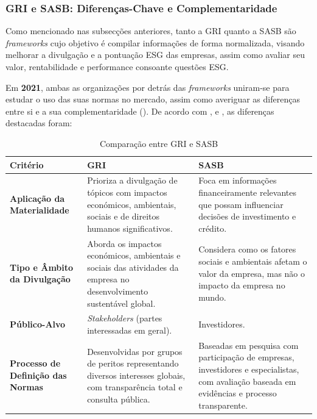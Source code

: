 \subsubsection{GRI e SASB: Diferenças-Chave e Complementaridade}
\label{subsubsec: GRI_E_SASB}

Como mencionado nas subsecções anteriores, tanto a \gls{GRI} quanto a \gls{SASB} são \textit{frameworks} cujo objetivo é compilar informações de forma normalizada, visando melhorar a divulgação e a pontuação ESG das empresas, assim como avaliar seu valor, rentabilidade e performance consoante questões ESG.

Em \textbf{2021}, ambas as organizações por detrás das \textit{frameworks} uniram-se para estudar o uso das suas normas no mercado, assim como averiguar as diferenças entre si e a sua complementaridade (\cite{GRISASB2021}). De acordo com \cite{GRISASB2021}, \cite{Pizzi2023} e \cite{Antolin-Lopez2023}, as diferenças destacadas foram:

\begin{table}
    \centering
    \begin{tabular}{|p{3cm}|p{5cm}|p{5cm}|}
        \hline
        \textbf{Critério} & \textbf{GRI} & \textbf{SASB} \\
        \hline
        \textbf{Aplicação da Materialidade} & Prioriza a divulgação de tópicos com impactos económicos, ambientais, sociais e de direitos humanos significativos. & Foca em informações financeiramente relevantes que possam influenciar decisões de investimento e crédito. \\
        \hline
        \textbf{Tipo e Âmbito da Divulgação} & Aborda os impactos económicos, ambientais e sociais das atividades da empresa no desenvolvimento sustentável global. & Considera como os fatores sociais e ambientais afetam o valor da empresa, mas não o impacto da empresa no mundo. \\
        \hline
        \textbf{Público-Alvo} & \textit{Stakeholders} (partes interessadas em geral). & Investidores. \\
        \hline
        \textbf{Processo de Definição das Normas} & Desenvolvidas por grupos de peritos representando diversos interesses globais, com transparência total e consulta pública. & Baseadas em pesquisa com participação de empresas, investidores e especialistas, com avaliação baseada em evidências e processo transparente. \\
        \hline
    \end{tabular}
    \caption{Comparação entre GRI e SASB}
    \label{tab:gri_sasb}
\end{table}

